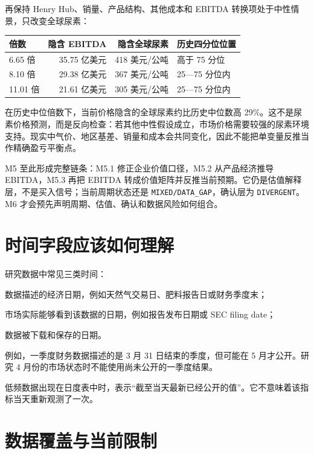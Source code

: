 \documentclass[11pt,a4paper]{ctexart}
\begin{document}
再保持 Henry Hub、销量、产品结构、其他成本和 EBITDA 转换项处于中性情景，只改变全球尿素：

\begin{center}
\small
\begin{tabular}{l r r l}
\toprule
倍数 & 隐含 EBITDA & 隐含全球尿素 & 历史四分位位置 \\
\midrule
6.65 倍 & 35.75 亿美元 & 418 美元/公吨 & 高于 75 分位 \\
8.10 倍 & 29.38 亿美元 & 367 美元/公吨 & 25---75 分位内 \\
11.01 倍 & 21.61 亿美元 & 305 美元/公吨 & 25---75 分位内 \\
\bottomrule
\end{tabular}
\normalsize
\end{center}

在历史中位倍数下，当前价格隐含的全球尿素约比历史中位数高 29\%。这不是尿素价格预测，而是反向检查：若其他中性假设成立，市场价格需要较强的尿素环境支持。现实中气价、地区基差、销量和成本会共同变化，因此不能把单变量反推当作精确盈亏平衡点。

M5 至此形成完整链条：M5.1 修正企业价值口径，M5.2 从产品经济推导 EBITDA，M5.3 再把 EBITDA 转成价值矩阵并反推当前预期。它仍是估值解释层，不是买入信号；当前周期状态还是 \texttt{MIXED/DATA\_GAP}，确认层为 \texttt{DIVERGENT}。M6 才会预先声明周期、估值、确认和数据风险如何组合。

\section{时间字段应该如何理解}

研究数据中常见三类时间：

\begin{description}[style=nextline]
  \item[观察日期] 数据描述的经济日期，例如天然气交易日、肥料报告日或财务季度末；
  \item[公开日期] 市场实际能够看到该数据的日期，例如报告发布日期或 SEC filing date；
  \item[本地获取日期] 数据被下载和保存的日期。
\end{description}

例如，一季度财务数据描述的是 3 月 31 日结束的季度，但可能在 5 月才公开。研究 4 月份的市场状态时不能使用尚未公开的一季度结果。

低频数据出现在日度表中时，表示“截至当天最新已经公开的值”。它不意味着该指标当天重新观测了一次。

\section{数据覆盖与当前限制}
\end{document}

